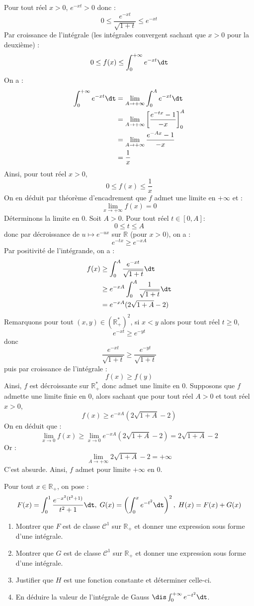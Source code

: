 \documentclass[a4paper,10pt]{report}
\begin{document}
\begin{enumerate}
Pour tout réel $x>0$, $e^{-xt} > 0$ donc :
$$  0 \leq \dfrac{e^{-xt}}{\sqrt{1+t}} \leq e^{-xt}$$
Par croissance de l'intégrale (les intégrales convergent sachant que $x>0$ pour la deuxième) :
$$ 0 \leq f(x) \leq \int_0^{+ \infty} e^{-xt} \dt$$
On a :
\begin{align*}
\int_0^{+ \infty} e^{-xt} \dt & =\lim_{A \rightarrow + \infty} \int_0^{A} e^{-xt} \dt \\
& = \lim_{A \rightarrow + \infty} \left[ \dfrac{e^{-tx}-1}{-x} \right]_0^A \\
&  = \lim_{A \rightarrow + \infty} \dfrac{e^{-Ax}-1}{-x} \\
& = \dfrac{1}{x}
\end{align*}
Ainsi, pour tout réel $x>0$,
$$ 0 \leq f(x) \leq \dfrac{1}{x}$$
On en déduit par théorème d'encadrement que $f$ admet une limite en $+ \infty$ et :
$$ \lim_{x \rightarrow + \infty} f(x) = 0$$
Déterminons la limite en $0$. Soit $A >0$. Pour tout réel $t \in [0,A]$:
$$ 0 \leq t \leq A$$
donc par décroissance de $u \mapsto e^{-ux}$ sur $\mathbb{R}$ (pour $x>0)$, on a :
$$  e^{-tx} \geq  e^{-xA}$$
Par positivité de l'intégrande, on a :
\begin{align*}
 f(x) & \geq \int_0^{A} \dfrac{e^{-xt}}{\sqrt{1+t}}  \dt  \\
 & \geq e^{-xA} \int_0^A \dfrac{1}{\sqrt{1+t}}  \dt  \\ 
 & = e^{-xA} (2 \sqrt{1+A}-2) 
\end{align*}
Remarquons pour tout $(x,y) \in (\mathbb{R}_+^*)^2$, si $x<y$ alors pour tout réel $t \geq 0$,
$$ e^{-xt} \geq e^{-yt}$$
donc 
$$ \dfrac{e^{-xt}}{\sqrt{1+t}} \geq \dfrac{e^{-yt}}{\sqrt{1+t}}$$
puis par croissance de l'intégrale :
$$ f(x) \geq f(y)$$
Ainsi, $f$ est décroissante sur $\mathbb{R}_+^*$ donc admet une limite en $0$. Supposons que $f$ admette une limite finie en $0$, alors sachant que pour tout réel $A>0$ et tout réel $x>0$,
$$ f(x) \geq  e^{-xA} (2 \sqrt{1+A}-2) $$
On en déduit que :
$$ \lim_{x \rightarrow 0} f(x) \geq \lim_{x \rightarrow 0} e^{-xA} (2 \sqrt{1+A}-2) = 2 \sqrt{1+A}-2$$
Or :
$$ \lim_{A \rightarrow + \infty} 2 \sqrt{1+A}-2 = + \infty$$
C'est absurde. Ainsi, $f$ admet pour limite $+ \infty$ en $0$.
\end{enumerate}

\begin{Exa} Pour tout $x \in \mathbb{R}_+$, on pose :
 $$ F(x) = \int_{0}^1 \frac{e^{-x^2(t^2+1)}}{t^2+1} \dt, \; G(x) = \left( \int_{0}^x e^{-t^2} \dt \right)^2, \; H(x)=F(x)+G(x)$$
 
 \begin{enumerate}
 \item Montrer que $F$ est de classe $\mathcal{C}^1$ sur $\mathbb{R}_+$ et donner une expression sous forme d'une intégrale.
 \item Montrer que $G$ est de classe $\mathcal{C}^1$ sur $\mathbb{R}_+$ et donner une expression sous forme d'une intégrale.
 \item Justifier que $H$ est une fonction constante et déterminer celle-ci.
 \item En déduire la valeur de l'intégrale de Gauss $\dis \int_{0}^{+ \infty} e^{-t^2} \dt$.
 \end{enumerate}
\end{Exa}
\end{document}

